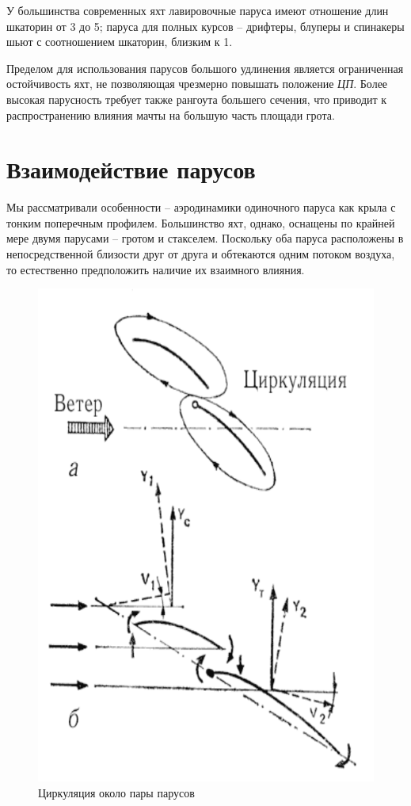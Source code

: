\documentclass[a4paper, 12pt, twoside, final, book, russian, fittopage, cyremdash]{ncc}
\begin{document}
У большинства современных яхт лавировочные паруса имеют отношение длин шкаторин от 3 до 5; паруса для полных курсов \--- дрифтеры, блуперы и спинакеры шьют с соотношением шкаторин, близким к 1.

Пределом для использования парусов большого удлинения является ограниченная остойчивость яхт, не позволяющая чрезмерно повышать положение \textit{ЦП}. Более высокая парусность требует также рангоута большего сечения, что приводит к распространению влияния мачты на большую часть площади грота.

\section{Взаимодействие парусов}

Мы рассматривали особенности \--- аэродинамики одиночного паруса как крыла с тонким поперечным профилем. Большинство яхт, однако, оснащены по крайней мере двумя парусами \--- гротом и стакселем. Поскольку оба паруса расположены в непосредственной близости друг от друга и обтекаются одним потоком воздуха, то естественно предположить наличие их взаимного влияния. 

\begin{figure}[htb]
  \centering
  \includegraphics[scale=1]{0029}
  \caption{Циркуляция около пары парусов}
  \label{fig:29}
\end{figure}
\end{document}
